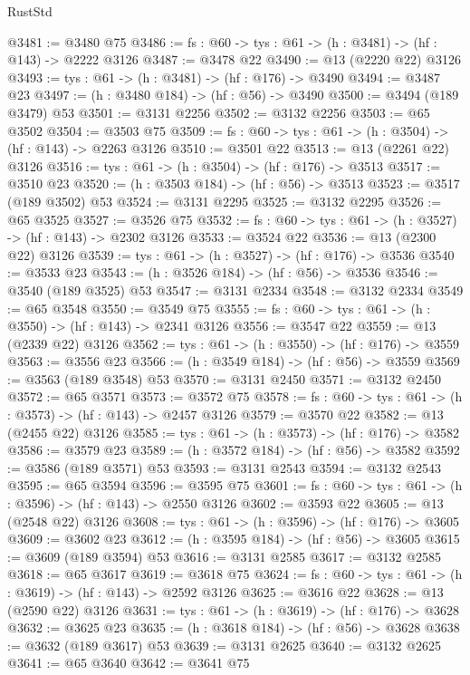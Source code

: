 \begin{lexlean}{RustStd}
\begin{coremodule}
@3481 := @3480 @75
@3486 := {fs : @60} -> {tys : @61} -> (h : @3481) -> (hf : @143) -> @2222 @3126
@3487 := @3478 @22
@3490 := @13 (@2220 @22) @3126
@3493 := {tys : @61} -> (h : @3481) -> (hf : @176) -> @3490
@3494 := @3487 @23
@3497 := (h : @3480 @184) -> (hf : @56) -> @3490
@3500 := @3494 (@189 @3479) @53
@3501 := @3131 @2256
@3502 := @3132 @2256
@3503 := @65 @3502
@3504 := @3503 @75
@3509 := {fs : @60} -> {tys : @61} -> (h : @3504) -> (hf : @143) -> @2263 @3126
@3510 := @3501 @22
@3513 := @13 (@2261 @22) @3126
@3516 := {tys : @61} -> (h : @3504) -> (hf : @176) -> @3513
@3517 := @3510 @23
@3520 := (h : @3503 @184) -> (hf : @56) -> @3513
@3523 := @3517 (@189 @3502) @53
@3524 := @3131 @2295
@3525 := @3132 @2295
@3526 := @65 @3525
@3527 := @3526 @75
@3532 := {fs : @60} -> {tys : @61} -> (h : @3527) -> (hf : @143) -> @2302 @3126
@3533 := @3524 @22
@3536 := @13 (@2300 @22) @3126
@3539 := {tys : @61} -> (h : @3527) -> (hf : @176) -> @3536
@3540 := @3533 @23
@3543 := (h : @3526 @184) -> (hf : @56) -> @3536
@3546 := @3540 (@189 @3525) @53
@3547 := @3131 @2334
@3548 := @3132 @2334
@3549 := @65 @3548
@3550 := @3549 @75
@3555 := {fs : @60} -> {tys : @61} -> (h : @3550) -> (hf : @143) -> @2341 @3126
@3556 := @3547 @22
@3559 := @13 (@2339 @22) @3126
@3562 := {tys : @61} -> (h : @3550) -> (hf : @176) -> @3559
@3563 := @3556 @23
@3566 := (h : @3549 @184) -> (hf : @56) -> @3559
@3569 := @3563 (@189 @3548) @53
@3570 := @3131 @2450
@3571 := @3132 @2450
@3572 := @65 @3571
@3573 := @3572 @75
@3578 := {fs : @60} -> {tys : @61} -> (h : @3573) -> (hf : @143) -> @2457 @3126
@3579 := @3570 @22
@3582 := @13 (@2455 @22) @3126
@3585 := {tys : @61} -> (h : @3573) -> (hf : @176) -> @3582
@3586 := @3579 @23
@3589 := (h : @3572 @184) -> (hf : @56) -> @3582
@3592 := @3586 (@189 @3571) @53
@3593 := @3131 @2543
@3594 := @3132 @2543
@3595 := @65 @3594
@3596 := @3595 @75
@3601 := {fs : @60} -> {tys : @61} -> (h : @3596) -> (hf : @143) -> @2550 @3126
@3602 := @3593 @22
@3605 := @13 (@2548 @22) @3126
@3608 := {tys : @61} -> (h : @3596) -> (hf : @176) -> @3605
@3609 := @3602 @23
@3612 := (h : @3595 @184) -> (hf : @56) -> @3605
@3615 := @3609 (@189 @3594) @53
@3616 := @3131 @2585
@3617 := @3132 @2585
@3618 := @65 @3617
@3619 := @3618 @75
@3624 := {fs : @60} -> {tys : @61} -> (h : @3619) -> (hf : @143) -> @2592 @3126
@3625 := @3616 @22
@3628 := @13 (@2590 @22) @3126
@3631 := {tys : @61} -> (h : @3619) -> (hf : @176) -> @3628
@3632 := @3625 @23
@3635 := (h : @3618 @184) -> (hf : @56) -> @3628
@3638 := @3632 (@189 @3617) @53
@3639 := @3131 @2625
@3640 := @3132 @2625
@3641 := @65 @3640
@3642 := @3641 @75

\end{coremodule}
\end{lexlean}

